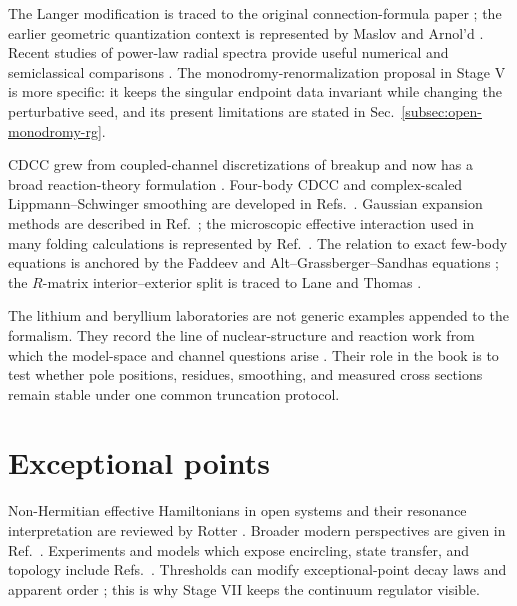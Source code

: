 The Langer modification is traced to the original connection-formula paper
\cite{Langer:PhysRev.51.669}; the earlier geometric quantization context is
represented by Maslov and Arnol'd
\cite{Maslov1965PerturbationsAsymptotic,Arnold1967CharacteristicClassQuantization}.
Recent studies of power-law radial spectra provide useful numerical and
semiclassical comparisons \cite{delValle:2021pjv,delValle:2023feg}.  The
monodromy-renormalization proposal in Stage V is more specific: it keeps the
singular endpoint data invariant while changing the perturbative seed, and
its present limitations are stated in Sec.~\ref{subsec:open-monodromy-rg}.

CDCC grew from coupled-channel discretizations of breakup
\cite{Kamimura1986CDCC,Austern1987CDCC} and now has a broad reaction-theory
formulation \cite{Yahiro2012CDCC}.  Four-body CDCC and complex-scaled
Lippmann--Schwinger smoothing are developed in
Refs.~\cite{Matsumoto2004FourBodyCDCC,Kikuchi2009CSLS,Kikuchi2010CSLS}.
Gaussian expansion methods are described in Ref.~\cite{Hiyama:2003cu}; the
microscopic effective interaction used in many folding calculations is
represented by Ref.~\cite{Jeukenne1977JLM}.  The relation to exact few-body
equations is anchored by the Faddeev and Alt--Grassberger--Sandhas equations
\cite{Faddeev1961,AltGrassbergerSandhas1967}; the $R$-matrix interior--exterior
split is traced to Lane and Thomas \cite{LaneThomas1958RMatrix}.

The lithium and beryllium laboratories are not generic examples appended to
the formalism.  They record the line of nuclear-structure and reaction work
from which the model-space and channel questions arise
\cite{OgawaThesis:2022,arXiv:2003.05123,arXiv:2103.16865,
arXiv:2111.04285,Ogawa:2024He5,Ogawa:2025S18,Ogata:2026LiCDCC}.  Their role in
the book is to test whether pole positions, residues, smoothing, and measured
cross sections remain stable under one common truncation protocol.

\section*{Exceptional points}

Non-Hermitian effective Hamiltonians in open systems and their resonance
interpretation are reviewed by Rotter \cite{Rotter2007NonHermitian,
Rotter:2007zng}.  Broader modern perspectives are given in
Ref.~\cite{Ashida2020NonHermitian}.  Experiments and models which expose
encircling, state transfer, and topology include
Refs.~\cite{Naghiloo:2019dqw,Gong2018Topological,Gneiting:2020pew}.
Thresholds can modify exceptional-point decay laws and apparent order
\cite{Garmon2017NonExpThreshold,Garmon2021AnomalousEP}; this is why Stage VII
keeps the continuum regulator visible.

